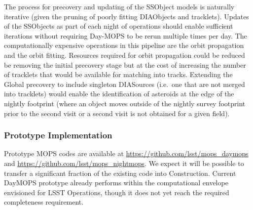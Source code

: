The process for precovery and updating of the SSObject models is naturally iterative (given the pruning of poorly fitting DIAObjects and tracklets). Updates of the SSObjects as part of each night of operations should enable sufficient iterations without requiring Day-MOPS to be rerun multiple times per day. The computationally expensive operations in this pipeline are the orbit propagation and the orbit fitting. Resources required for orbit propagation could be reduced be removing the initial precovery stage but at the cost of increasing the number of tracklets that would be available for matching into tracks. Extending the Global precovery to include singleton DIASources (i.e.\ one that are not merged into tracklets) would enable the identification of asteroids at the edge of the nightly footprint (where an object moves outside of the nightly survey footprint prior to the second visit or a second visit is not obtained for a given field).

\subsubsection{Prototype Implementation}

Prototype MOPS codes are available at
\url{https://github.com/lsst/mops_daymops} and
\url{https://github.com/lsst/mops_nightmops}. We expect it will be
possible to transfer a significant fraction of the existing code into
Construction. Current DayMOPS prototype already performs within the
computational envelope envisioned for LSST Operations, though it does
not yet reach the required completeness requirement.



